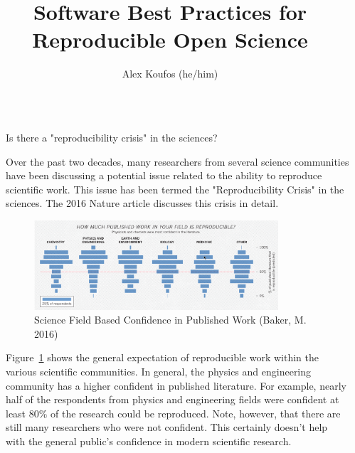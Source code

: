 \documentclass[final]{beamer}
\title{Software Best Practices for Reproducible Open Science}
\author{Alex Koufos (he/him)\inst{1}} %
\institute[shortinst]{\inst{1} Stanford University}
\newlength{\sepwidth}
\newlength{\colwidth}
\newcommand{\separatorcolumn}{\begin{column}{\sepwidth}\end{column}}
\begin{document}
\begin{frame}[t]
\begin{columns}[t]
\separatorcolumn

\begin{column}{\colwidth}

  \begin{block}{Is there a "reproducibility crisis" in the sciences?}

    Over the past two decades, many researchers from several science communities
    have been discussing a potential issue related to the ability to reproduce
    scientific work.
    This issue has been termed the "Reproducibility Crisis" in the sciences.
    The 2016 Nature article\cite{baker2016} discusses this crisis in detail.
       
    \begin{figure}
      \centering
      \includegraphics[width=0.85\textwidth]{tess2024/Nature-Field-Confidence.png}
      \caption{Science Field Based Confidence in Published Work (Baker, M. 2016)\cite{baker2016}}
      \label{fig:confidence}
    \end{figure}

    Figure~\ref*{fig:confidence} shows the general expectation of reproducible
    work within the various scientific communities.
    In general, the physics and engineering community has a higher confident in
    published literature.
    For example, nearly half of the respondents from physics and
    engineering fields were confident at least $80\%$ of the research could be
    reproduced.
    Note, however, that there are still many researchers who were not confident.
    This certainly doesn't help with the general public's confidence in modern
    scientific research.


\end{block}
\end{column}
\end{columns}
\end{frame}
\end{document}
